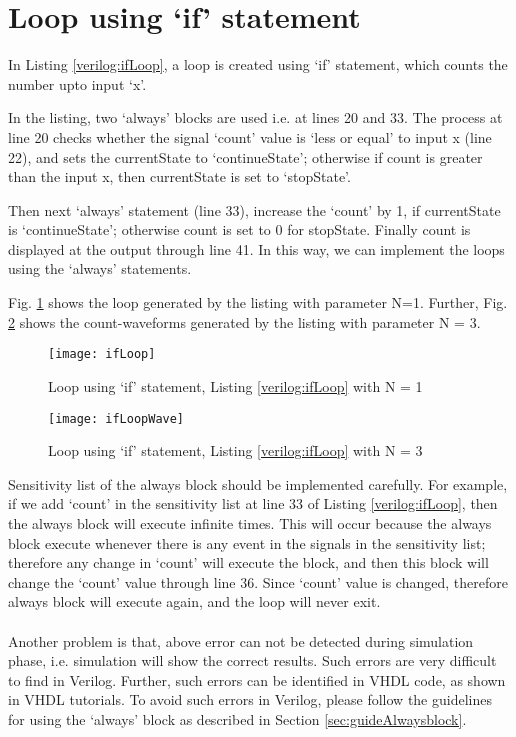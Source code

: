 \section{Loop using `if' statement}\label{sec:ifLoop}
In Listing \ref{verilog:ifLoop}, a loop is created using `if' statement, which counts the number upto input `x'. 

\begin{explanation}
	In the listing, two `always' blocks are used i.e. at lines 20 and 33. The process at line 20 checks whether the signal `count' value is `less or equal' to input x (line 22), and sets the currentState to `continueState'; otherwise if count is greater than the input x, then currentState is set to `stopState'.
	
	Then next `always' statement (line 33), increase the `count' by 1, if currentState is `continueState'; otherwise count is set to 0 for stopState. Finally count is displayed at the output through line 41. In this way, we can implement the loops using the `always' statements. 
	
	Fig. \ref{fig:ifLoop} shows the loop generated by the listing with parameter N=1. Further,  Fig. \ref{fig:ifLoopWave} shows the count-waveforms generated by the listing with parameter N = 3.
\end{explanation}
%

\begin{figure}[!h]
	\centering
	\texttt{[image: ifLoop]}
	\caption{Loop using `if' statement, Listing \ref{verilog:ifLoop} with N = 1}
	\label{fig:ifLoop}
\end{figure}

\begin{figure}[!h]
	\centering
	\texttt{[image: ifLoopWave]}
	\caption{Loop using `if' statement, Listing \ref{verilog:ifLoop} with N = 3}
	\label{fig:ifLoopWave}
\end{figure}
%
\begin{noNumBox}
	Sensitivity list of the always block should be implemented carefully. For example, if we add `count' in the sensitivity list at line 33 of Listing  \ref{verilog:ifLoop}, then the always block will execute infinite times. This will occur because the always block execute whenever there is any event in the signals in the sensitivity list; therefore any change in `count' will execute the block, and then this block will change the `count' value through line 36. Since `count' value is changed, therefore always block will execute again, and the loop will never exit.  
	\\ \\
	Another problem is that,  above error can not be detected during simulation phase, i.e. simulation will show the correct results. Such errors are very difficult to find in Verilog. Further, such errors can be identified in VHDL code, as shown in VHDL tutorials. To avoid such errors in Verilog, please follow the guidelines for using the `always' block as described in Section \ref{sec:guideAlwaysblock}. 
\end{noNumBox}
%
